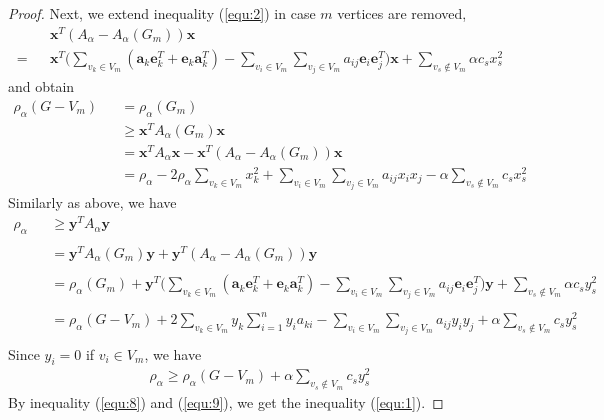 \documentclass[amsthm]{elsart}
\begin{document}
\begin{proof}
Next, we extend inequality (\ref{equ:2}) in case $m$ vertices are removed,
\begin{eqnarray*}
  &&\textbf{x}^T(A_\alpha - A_\alpha(G_m))\textbf{x}
\\ = &&\textbf{x}^T \Big(\sum \limits_{v_k \in V_m}^{} (\textbf{a}_k \textbf{e}_k^T + \textbf{e}_k \textbf{a}_k^T)
- \sum \limits_{v_i \in V_m}^{} \sum \limits_{v_j \in V_m}^{} a_{ij} \textbf{e}_i \textbf{e}_j^T \Big) \textbf{x}
+ \sum \limits_{v_s \notin V_m}^{} \alpha c_s x_s^2
\end{eqnarray*}
and obtain \\
\begin{eqnarray}
\nonumber \rho_\alpha(G - V_m)
&&= \rho_\alpha(G_m)
\\ \nonumber &&\geqslant \textbf{x}^T A_\alpha(G_m) \textbf{x}
\\ \nonumber &&= \textbf{x}^T A_\alpha \textbf{x} - \textbf{x}^T(A_\alpha - A_\alpha(G_m))\textbf{x}
\\ \label{equ:8} &&= \rho_\alpha
   - 2 \rho_\alpha \sum \limits_{v_k \in V_m}^{} x_k^2
   + \sum \limits_{v_i \in V_m}^{} \sum \limits_{v_j \in V_m}^{} a_{ij} x_i x_j
   - \alpha \sum \limits_{v_s \notin V_m}^{} c_s x_s^2
\end{eqnarray}
Similarly as above, we have
\begin{eqnarray*}
\rho_\alpha
&&\geqslant \textbf{y} ^T A_\alpha \textbf{y} \\
\\ &&= \textbf{y} ^T A_\alpha(G_m) \textbf{y} + \textbf{y}^T (A_\alpha - A_\alpha(G_m)) \textbf{y} \\
\\ &&= \rho_\alpha(G_m) + \textbf{y}^T \Big(\sum \limits_{v_k \in V_m}^{} (\textbf{a}_k \textbf{e}_k^T + \textbf{e}_k \textbf{a}_k^T)
  - \sum \limits_{v_i \in V_m}^{} \sum \limits_{v_j \in V_m}^{} a_{ij} \textbf{e}_i \textbf{e}_j^T \Big) \textbf{y}
  + \sum \limits_{v_s \notin V_m}^{} \alpha c_s y_s^2 \\
\\ &&= \rho_\alpha(G - V_m)
  + 2 \sum \limits_{v_k \in V_m}^{} y_k \sum \limits_{i=1}^{n}y_i a_{ki}
  - \sum \limits_{v_i \in V_m}^{} \sum \limits_{v_j \in V_m}^{} a_{ij} y_i y_j
  + \alpha \sum \limits_{v_s \notin V_m}^{} c_s y_s^2 \\
\end{eqnarray*}
Since $y_i = 0$ if $v_i \in V_m$, we have
\begin{eqnarray} \label{equ:9}
\rho_\alpha
\geqslant \rho_\alpha(G - V_m) + \alpha \sum \limits_{v_s \notin V_m}^{} c_s y_s^2
\end{eqnarray}
By inequality (\ref{equ:8}) and (\ref{equ:9}), we get the inequality (\ref{equ:1}).
\end{proof}
\end{document}
